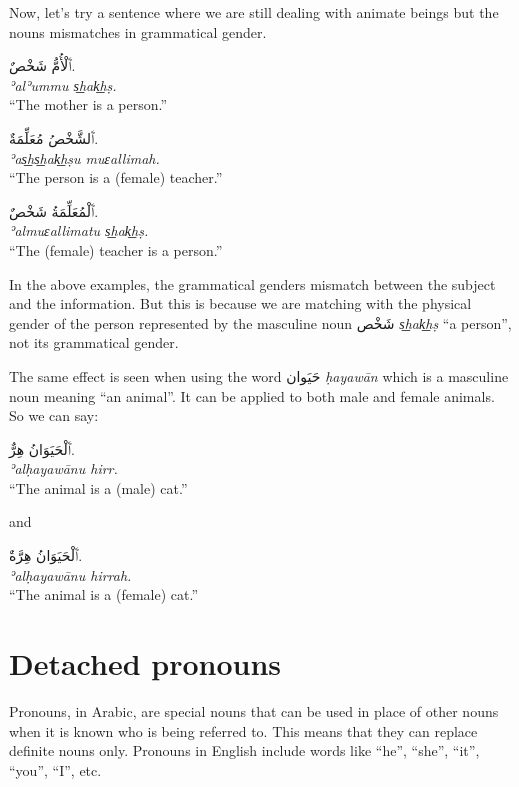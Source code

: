\documentclass[
  10pt,
]{book}
\begin{document}
Now, let's try a sentence where we are still dealing with animate beings but the nouns mismatches in grammatical gender.

\foreignlanguage{arabic}{ٱَلْأُمُّ شَخْصٌ.}\\
\emph{ʾalʾummu s͟hak͟hṣ.}\\
\enquote{The mother is a person.}

\foreignlanguage{arabic}{ٱَلشَّخْصُ مُعَلِّمَةٌ.}\\
\emph{ʾas͟hs͟hak͟hṣu muɛallimah.}\\
\enquote{The person is a (female) teacher.}

\foreignlanguage{arabic}{ٱَلْمُعَلِّمَةُ شَخْصٌ.}\\
\emph{ʾalmuɛallimatu s͟hak͟hṣ.}\\
\enquote{The (female) teacher is a person.}

In the above examples, the grammatical genders mismatch between the subject and the information. But this is because we are matching with the physical gender of the person represented by the masculine noun \foreignlanguage{arabic}{شَخْص} \emph{s͟hak͟hṣ} \enquote{a person}, not its grammatical gender.

The same effect is seen when using the word \foreignlanguage{arabic}{حَيَوان} \emph{ḥayawān} which is a masculine noun meaning \enquote{an animal}. It can be applied to both male and female animals. So we can say:

\foreignlanguage{arabic}{ٱَلْحَيَوَانُ هِرٌّ.}\\
\emph{ʾalḥayawānu hirr.}\\
\enquote{The animal is a (male) cat.}

and

\foreignlanguage{arabic}{ٱَلْحَيَوَانُ هِرَّةٌ.}\\
\emph{ʾalḥayawānu hirrah.}\\
\enquote{The animal is a (female) cat.}

\section{Detached pronouns}\label{detached-pronouns}

Pronouns, in Arabic, are special nouns that can be used in place of other nouns when it is known who is being referred to. This means that they can replace definite nouns only. Pronouns in English include words like \enquote{he}, \enquote{she}, \enquote{it}, \enquote{you}, \enquote{I}, etc.
\end{document}
